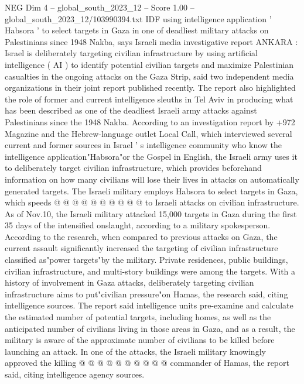 \begin{textsample}{NEG Dim 4 – global\_south\_2023\_12 – Score 1.00 – global\_south\_2023\_12/103990394.txt}  \label{ex:f4_neg_315}
IDF using intelligence application ' Habsora ' to select targets in Gaza in one of deadliest military attacks on Palestinians since 1948 Nakba, says Israeli media investigative report ANKARA : Israel is deliberately targeting civilian infrastructure by using artificial intelligence ( AI ) to identify potential civilian targets and maximize Palestinian casualties in the ongoing attacks on the Gaza Strip, said two independent media organizations in their joint report published recently.
The report also highlighted the role of former and current intelligence sleuths in Tel Aviv in producing what has been described as one of the deadliest Israeli army attacks against Palestinians since the 1948 Nakba.
According to an investigation report by +972 Magazine and the Hebrew-language outlet Local Call, which interviewed several current and former sources in Israel ' s intelligence community who know the intelligence application"Habsora"or the Gospel in English, the Israeli army uses it to deliberately target civilian infrastructure, which provides beforehand information on how many civilians will lose their lives in attacks on automatically generated targets.
The Israeli military employs Habsora to select targets in Gaza, which speeds @ @ @ @ @ @ @ @ @ @ to Israeli attacks on civilian infrastructure.
As of Nov.10, the Israeli military attacked 15,000 targets in Gaza during the first 35 days of the intensified onslaught, according to a military spokesperson.
According to the research, when compared to previous attacks on Gaza, the current assault significantly increased the targeting of civilian infrastructure classified as"power targets"by the military.
Private residences, public buildings, civilian infrastructure, and multi-story buildings were among the targets.
With a history of involvement in Gaza attacks, deliberately targeting civilian infrastructure aims to put"civilian pressure"on Hamas, the research said, citing intelligence sources.
The report said intelligence units pre-examine and calculate the estimated number of potential targets, including homes, as well as the anticipated number of civilians living in those areas in Gaza, and as a result, the military is aware of the approximate number of civilians to be killed before launching an attack.
In one of the attacks, the Israeli military knowingly approved the killing @ @ @ @ @ @ @ @ @ @ commander of Hamas, the report said, citing intelligence agency sources.

\end{textsample}
